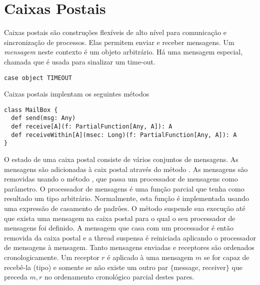\section{Caixas Postais}
\label{sec:mailbox}

Caixas postais são construções flexíveis de alto nível para comunicação e sincronização de processos. Elas permitem enviar e receber mensagens. 
Um {\em mensagem} neste contexto é um objeto arbitrário.
Há uma mensagem especial, chamada  que é usada para sinalizar um time-out.
\begin{lstlisting}
case object TIMEOUT
\end{lstlisting}
Caixas postais implentam os seguintes métodos
\begin{lstlisting}
class MailBox {
  def send(msg: Any)
  def receive[A](f: PartialFunction[Any, A]): A
  def receiveWithin[A](msec: Long)(f: PartialFunction[Any, A]): A
}
\end{lstlisting}
O estado de uma caixa postal consiste de vários conjuntos de mensagens.
As mensagens são adicionadas à caix postal através do método .
As mensagens são removidas usando o método , que passa um processador de mensagens  como parâmetro. O processador de mensagens é uma função parcial que tenha como resultado um tipo arbitrário. Normalmente, esta função é implementada usando uma expressão de casamento de padrôes. O método  suspende sua execução até que exista uma mensagem na caixa postal para o qual o seu processador de mensagens foi definido. A mensagem que casa com um processador é então removida da caixa postal e a thread suspensa é reiniciada aplicando o processador de mensagens à mensagem. Tanto mensagens enviadas e receptores são ordenados cronologicamente.  Um receptor $r$ é aplicado à uma mensagem $m$ se for capaz de recebê-la (tipo) e somente se não existe um outro par $\{$message, receiver$\}$ que preceda ${m,
r}$ no ordenamento cronológico parcial destes pares.

